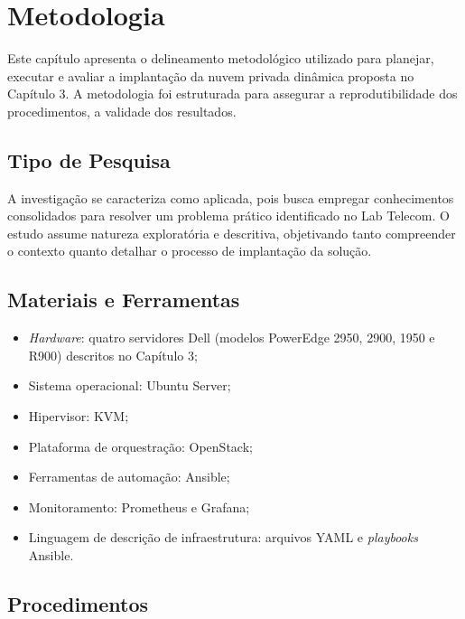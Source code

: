 
\chapter{Metodologia}
\setcounter{table}{0}
Este capítulo apresenta o delineamento metodológico utilizado para planejar, executar e avaliar a implantação da nuvem privada dinâmica proposta no Capítulo 3. A metodologia foi estruturada para assegurar a reprodutibilidade dos procedimentos, a validade dos resultados.

\section{Tipo de Pesquisa}
A investigação se caracteriza como aplicada, pois busca empregar conhecimentos consolidados para resolver um problema prático identificado no Lab Telecom. O estudo assume natureza exploratória e descritiva, objetivando tanto compreender o contexto quanto detalhar o processo de implantação da solução.

\section{Materiais e Ferramentas}
\begin{itemize}
    \item \textit{Hardware}: quatro servidores Dell (modelos PowerEdge 2950, 2900, 1950 e R900) descritos no Capítulo 3;
    \item Sistema operacional: Ubuntu Server;
    \item Hipervisor: KVM;
    \item Plataforma de orquestração: OpenStack;
    \item Ferramentas de automação: Ansible;
    \item Monitoramento: Prometheus e Grafana;
    \item Linguagem de descrição de infraestrutura: arquivos YAML e \textit{playbooks} Ansible.
\end{itemize}

\section{Procedimentos}
